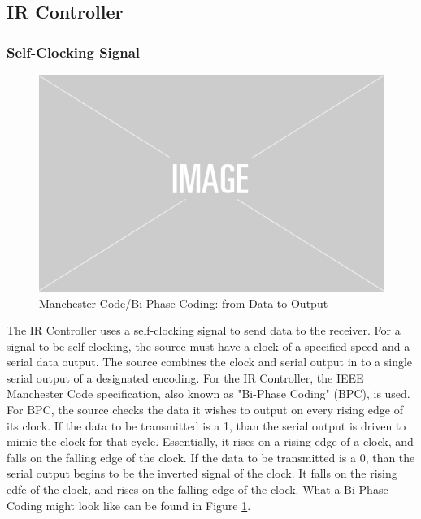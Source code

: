 \documentclass[]{article}
\begin{document}
\subsection{IR Controller}
\subsubsection{Self-Clocking Signal}
\begin{figure}[H]\centering
    \includegraphics[width=0.5\linewidth]{figures/placeholder.png}
    \caption{Manchester Code/Bi-Phase Coding: from Data to Output} 
    \label{fig:biPhaseExample}
\end{figure}
\label{subsubsec:selfClockingSignal}
The IR Controller uses a self-clocking signal to send data to the receiver.
For a signal to be self-clocking, the source must have a clock of a specified speed and a serial data output.
The source combines the clock and serial output in to a single serial output of a designated encoding.
For the IR Controller, the IEEE Manchester Code specification, also known as "Bi-Phase Coding" (BPC), is used.
For BPC, the source checks the data it wishes to output on every rising edge of its clock.
If the data to be transmitted is a 1, than the serial output is driven to mimic the clock for that cycle.
Essentially, it rises on a rising edge of a clock, and falls on the falling edge of the clock.
If the data to be transmitted is a 0, than the serial output begins to be the inverted signal of the clock.
It falls on the rising edfe of the clock, and rises on the falling edge of the clock. 
What a Bi-Phase Coding might look like can be found in Figure \ref{fig:biPhaseExample}.
\end{document}
